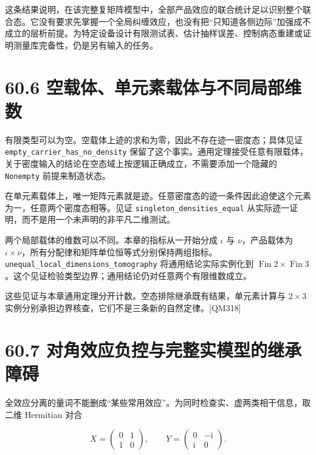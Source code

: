 \documentclass[
  11pt,
  oneside]{book}
\begin{document}
这条结果说明，在该完整复矩阵模型中，全部产品效应的联合统计足以识别整个联合态。它没有要求先掌握一个全局纠缠效应，也没有把``只知道各侧边际''加强成不成立的层析前提。为特定设备设计有限测试表、估计抽样误差、控制病态重建或证明测量库完备性，仍是另有输入的任务。

\hypertarget{ux7a7aux8f7dux4f53ux5355ux5143ux7d20ux8f7dux4f53ux4e0eux4e0dux540cux5c40ux90e8ux7ef4ux6570}{%
\section{60.6
空载体、单元素载体与不同局部维数}\label{ux7a7aux8f7dux4f53ux5355ux5143ux7d20ux8f7dux4f53ux4e0eux4e0dux540cux5c40ux90e8ux7ef4ux6570}}

有限类型可以为空。空载体上迹的求和为零，因此不存在迹一密度态；具体见证
\texttt{empty\_\allowbreak carrier\_\allowbreak has\_\allowbreak no\_\allowbreak density}
保留了这个事实。通用定理接受任意有限载体，关于密度输入的结论在空态域上按逻辑正确成立，不需要添加一个隐藏的
\texttt{Nonempty} 前提来制造状态。

在单元素载体上，唯一矩阵元素就是迹。任意密度态的迹一条件因此迫使这个元素为一，任意两个密度态相等。见证
\texttt{singleton\_\allowbreak densities\_\allowbreak equal}
从实际迹一证明，而不是用一个未声明的非平凡二维测试。

两个局部载体的维数可以不同。本章的指标从一开始分成 \(\iota\) 与
\(\nu\)，产品载体为
\(\iota\times\nu\)，所有分配律和矩阵单位恒等式分别保持两组指标。\texttt{unequal\_\allowbreak local\_\allowbreak dimensions\_\allowbreak tomography}
将通用结论实际实例化到
\(\operatorname{Fin}2\times\operatorname{Fin}3\)。这个见证检验类型边界；通用结论仍对任意两个有限维数成立。

这些见证与本章通用定理分开计数。空态排除继承既有结果，单元素计算与
\(2\times3\) 实例分别承担边界核查，它们不是三条新的自然定律。{[}QM318{]}

\hypertarget{ux5bf9ux89d2ux6548ux5e94ux8d1fux63a7ux4e0eux5b8cux6574ux5b9eux6a21ux578bux7684ux7ee7ux627fux969cux788d}{%
\section{60.7
对角效应负控与完整实模型的继承障碍}\label{ux5bf9ux89d2ux6548ux5e94ux8d1fux63a7ux4e0eux5b8cux6574ux5b9eux6a21ux578bux7684ux7ee7ux627fux969cux788d}}

全效应分离的量词不能删成``某些常用效应''。为同时检查实、虚两类相干信息，取二维
Hermitian 对合

\[
X=\begin{pmatrix}0&1\\1&0\end{pmatrix},\qquad
Y=\begin{pmatrix}0&-\mathrm i\\\mathrm i&0\end{pmatrix}.
\]
\end{document}
